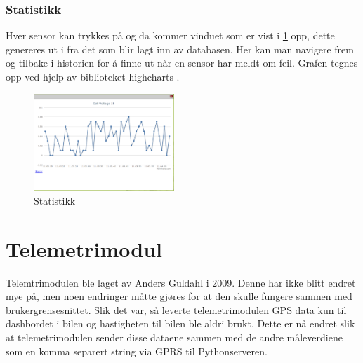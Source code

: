 \subsubsection{Statistikk}
Hver sensor kan trykkes på og da kommer vinduet som er vist i \ref{stats} opp, dette genereres ut i fra det som blir lagt inn av databasen. Her kan man navigere frem og tilbake i historien for å finne ut når en sensor har meldt om feil. Grafen tegnes opp ved hjelp av biblioteket highcharts \cite{highcharts}.
\begin{figure}[H]
\caption{Statistikk} 
\label{stats}
\includegraphics[width=200px]{images/stat.png}
\end{figure}
\section{Telemetrimodul}
Telemtrimodulen ble laget av Anders Guldahl \cite{telemetrithesis} i 2009. Denne har ikke blitt endret mye på, men noen endringer måtte gjøres for at den skulle fungere sammen med brukergrensesnittet.
Slik det var, så leverte telemetrimodulen GPS data kun til dashbordet i bilen og hastigheten til bilen ble aldri brukt. Dette er nå endret slik at telemetrimodulen sender disse dataene sammen med de andre måleverdiene som en komma separert string via GPRS til Pythonserveren.
